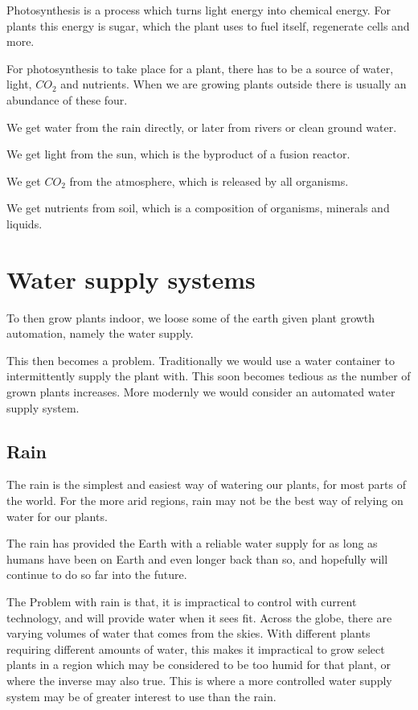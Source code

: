 \documentclass[a4paper,12pt,twoside,openright,titlepage]{book}
\begin{document}
Photosynthesis is a process which turns light energy into chemical energy. For plants this energy is sugar, which the plant uses to fuel itself, regenerate cells and more.

For photosynthesis to take place for a plant, there has to be a source of water, light, $CO_2$ and nutrients.
When we are growing plants outside there is usually an abundance of these four.

We get water from the rain directly, or later from rivers or clean ground water.

We get light from the sun, which is the byproduct of a fusion reactor.

We get $CO_2$ from the atmosphere, which is released by all organisms.

We get nutrients from soil, which is a composition of organisms, minerals and liquids.

\section{Water supply systems}
To then grow plants indoor, we loose some of the earth given plant growth automation, namely the water supply.

This then becomes a problem. Traditionally we would use a water container to intermittently supply the plant with. This soon becomes tedious as the number of grown plants increases.
More modernly we would consider an automated water supply system.

\subsection{Rain}
The rain is the simplest and easiest way of watering our plants, for most parts of the world. For the more arid regions, rain may not be the best way of relying on water for our plants.

The rain has provided the Earth with a reliable water supply for as long as humans have been on Earth and even longer back than so, and hopefully will continue to do so far into the future.

The Problem with rain is that, it is impractical to control with current technology, and will provide water when it sees fit.
Across the globe, there are varying volumes of water that comes from the skies. With different plants requiring different amounts of water, this makes it impractical to grow select plants in a region which may be considered to be too humid for that plant, or where the inverse may also true. This is where a more controlled water supply system may be of greater interest to use than the rain.
\end{document}
